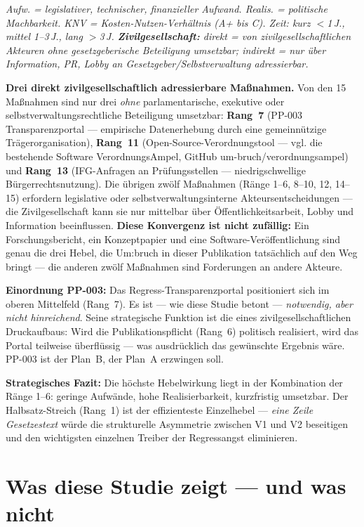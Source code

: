\documentclass{umbruch-position}
\begin{document}
\noindent\textit{Aufw. = legislativer, technischer, finanzieller Aufwand. Realis. = politische Machbarkeit. KNV = Kosten-Nutzen-Verhältnis (A+ bis C). Zeit: kurz $<$1\,J., mittel 1--3\,J., lang $>$3\,J. \textbf{Zivilgesellschaft:} \emph{direkt} = von zivilgesellschaftlichen Akteuren ohne gesetzgeberische Beteiligung umsetzbar; \emph{indirekt} = nur über Information, PR, Lobby an Gesetzgeber/Selbstverwaltung adressierbar.}

\medskip
\noindent\textbf{Drei direkt zivilgesellschaftlich adressierbare Maßnahmen.} Von den 15 Maßnahmen sind nur drei \textit{ohne} parlamentarische, exekutive oder selbstverwaltungsrechtliche Beteiligung umsetzbar: \textbf{Rang~7} (PP-003 Transparenzportal --- empirische Datenerhebung durch eine gemeinnützige Trägerorganisation), \textbf{Rang~11} (Open-Source-Verordnungstool --- vgl. die bestehende Software VerordnungsAmpel, GitHub um-bruch/verordnungsampel) und \textbf{Rang~13} (IFG-Anfragen an Prüfungsstellen --- niedrigschwellige Bürgerrechtsnutzung). Die übrigen zwölf Maßnahmen (Ränge 1--6, 8--10, 12, 14--15) erfordern legislative oder selbstverwaltungsinterne Akteursentscheidungen --- die Zivilgesellschaft kann sie nur mittelbar über Öffentlichkeitsarbeit, Lobby und Information beeinflussen. \textbf{Diese Konvergenz ist nicht zufällig:} Ein Forschungsbericht, ein Konzeptpapier und eine Software-Veröffentlichung sind genau die drei Hebel, die Um:bruch in dieser Publikation tatsächlich auf den Weg bringt --- die anderen zwölf Maßnahmen sind Forderungen an andere Akteure.

\medskip
\noindent\textbf{Einordnung PP-003:} Das Regress-Transparenzportal positioniert sich im oberen Mittelfeld (Rang~7). Es ist --- wie diese Studie betont --- \textit{notwendig, aber nicht hinreichend}. Seine strategische Funktion ist die eines zivilgesellschaftlichen Druckaufbaus: Wird die Publikationspflicht (Rang~6) politisch realisiert, wird das Portal teilweise überflüssig --- was ausdrücklich das gewünschte Ergebnis wäre. PP-003 ist der Plan~B, der Plan~A erzwingen soll.

\medskip
\noindent\textbf{Strategisches Fazit:} Die höchste Hebelwirkung liegt in der Kombination der Ränge 1--6: geringe Aufwände, hohe Realisierbarkeit, kurzfristig umsetzbar. Der Halbsatz-Streich (Rang~1) ist der effizienteste Einzelhebel --- \textit{eine Zeile Gesetzestext} würde die strukturelle Asymmetrie zwischen V1 und V2 beseitigen und den wichtigsten einzelnen Treiber der Regressangst eliminieren.


\section{Was diese Studie zeigt --- und was nicht}
\label{sec:schlusskapitel}
\end{document}
